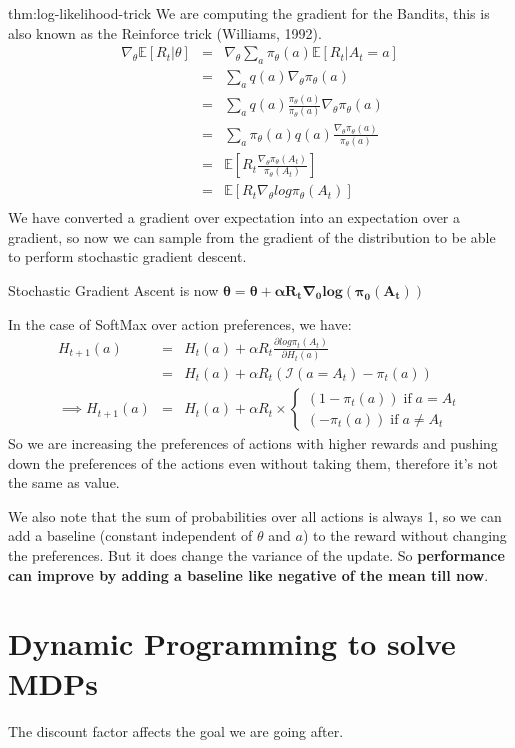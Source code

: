 \begin{theorem}{thm:log-likelihood-trick}
    We are computing the gradient for the Bandits, this is also known as the Reinforce trick (Williams, 1992).
    \begin{eqnarray}
        \nabla_\theta \mathbb{E}[R_t \vert \theta]
        &=& \nabla_\theta \sum_a \pi_\theta(a) \mathbb{E}[R_t \vert A_t = a] \\
        &=& \sum_a q(a) \nabla_\theta \pi_\theta(a) \\
        &=& \sum_a q(a) \frac{\pi_\theta(a)}{\pi_\theta(a)} \nabla_\theta \pi_\theta(a) \\
        &=& \sum_a \pi_\theta(a) q(a) \frac{\nabla_\theta \pi_\theta(a)}{\pi_\theta(a)} \\
        &=& \mathbb{E}[R_t \frac{\nabla_\theta \pi_\theta(A_t)}{\pi_\theta(A_t)}] \\
        &=& \mathbb{E}[R_t \nabla_\theta log \pi_\theta(A_t)] \\
    \end{eqnarray}
    We have converted a gradient over expectation into an expectation over a gradient, so now we can sample from the gradient of the distribution to be able to perform stochastic gradient descent.
\end{theorem}

Stochastic Gradient Ascent is now $\mathbf{\theta = \theta + \alpha R_t \nabla_0 log(\pi_0(A_t))}$

In the case of SoftMax over action preferences, we have:
\begin{eqnarray}
    H_{t+1}(a) &=& H_t(a) + \alpha R_t \frac{\partial log \pi_t(A_t)}{\partial H_t(a)} \\
    &=& H_t(a) + \alpha R_t (\mathcal{I}(a = A_t) - \pi_t(a)) \\
    \implies H_{t+1}(a) &=& H_t(a) + \alpha R_t \times \begin{cases}
        (1 - \pi_t(a)) \; \text{if}\; a = A_t \\
        (-\pi_t(a)) \; \text{if}\; a \neq A_t
    \end{cases}
\end{eqnarray}
So we are increasing the preferences of actions with higher rewards and pushing down the preferences of the actions even without taking them, therefore it's not the same as value.

We also note that the sum of probabilities over all actions is always 1, so we can add a baseline (constant independent of $\theta$ and $a$) to the reward without changing the preferences. But it does change the variance of the update. So
\textbf{performance can improve by adding a baseline like negative of the mean till now}.

\section{Dynamic Programming to solve MDPs}

The discount factor affects the goal we are going after.
